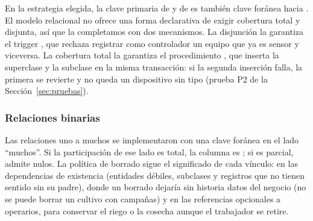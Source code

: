 En la estrategia elegida, la clave primaria de  y de  es también clave foránea hacia . El modelo relacional no ofrece una forma declarativa de exigir cobertura total y disjunta, así que la completamos con dos mecanismos. La disjunción la garantiza el trigger , que rechaza registrar como controlador un equipo que ya es sensor y viceversa. La cobertura total la garantiza el procedimiento , que inserta la superclase y la subclase en la misma transacción: si la segunda inserción falla, la primera se revierte y no queda un dispositivo sin tipo (prueba P2 de la Sección~\ref{sec:pruebas}).

\subsubsection{Relaciones binarias}

Las relaciones uno a muchos se implementaron con una clave foránea en el lado ``muchos''. Si la participación de ese lado es total, la columna es ; si es parcial, admite nulos. La política de borrado sigue el significado de cada vínculo:  en las dependencias de existencia (entidades débiles, subclases y registros que no tienen sentido sin su padre),  donde un borrado dejaría sin historia datos del negocio (no se puede borrar un cultivo con campañas) y  en las referencias opcionales a operarios, para conservar el riego o la cosecha aunque el trabajador se retire.

